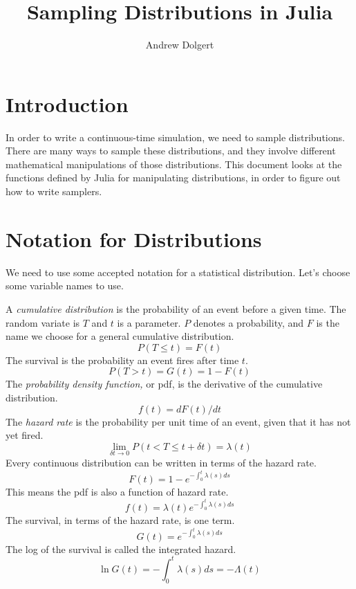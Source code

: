 \documentclass{article}
\title{Sampling Distributions in Julia}
\author{Andrew Dolgert}
\begin{document}
\maketitle

\section{Introduction}

In order to write a continuous-time simulation, we need to sample distributions. There are many ways to sample these distributions, and they involve different mathematical manipulations of those distributions. This document looks at the functions defined by Julia for manipulating distributions, in order to figure out how to write samplers.


\section{Notation for Distributions}
We need to use some accepted notation for a statistical distribution. Let's choose some variable names to use.

A \emph{cumulative distribution} is the probability of an event before a given time. The random variate is $T$ and $t$ is a parameter. $P$ denotes a probability, and $F$ is the name we choose for a general cumulative distribution.
\begin{equation}
  P(T \le t) = F(t)
\end{equation}
The survival is the probability an event fires after time $t$.
\begin{equation}
  P(T > t) = G(t) = 1 - F(t)
\end{equation}
The \emph{probability density function,} or pdf, is the derivative of the cumulative distribution.
\begin{equation}
  f(t) = dF(t)/dt
\end{equation}
The \emph{hazard rate} is the probability per unit time of an event, given that it has not yet fired.
\begin{equation}
\lim_{\delta t\rightarrow 0} P(t < T\le t + \delta t) = \lambda(t)
\end{equation}
Every continuous distribution can be written in terms of the hazard rate.
\begin{equation}
F(t) = 1 - e^{-\int_0^t\lambda(s)ds}
\end{equation}
This means the pdf is also a function of hazard rate.
\begin{equation}
f(t) = \lambda(t)e^{-\int_0^t\lambda(s)ds}
\end{equation}
The survival, in terms of the hazard rate, is one term.
\begin{equation}
G(t)=e^{-\int_0^t\lambda(s)ds}
\end{equation}
The log of the survival is called the integrated hazard.
\begin{equation}
\ln G(t) = -\int_0^t\lambda(s)ds = -\Lambda(t)
\end{equation}
\end{document}
